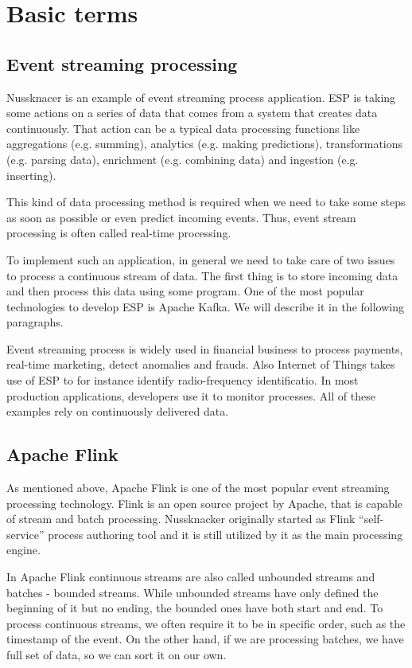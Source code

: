 \chapter{Basic terms}
\label{chap:basic}

\section{Event streaming processing}

Nussknacer is an example of event streaming process application.
ESP is taking some actions on a series of data that comes from a system that creates data continuously.
That action can be a typical data processing functions like aggregations (e.g. summing),
analytics (e.g. making predictions), transformations (e.g. parsing data), enrichment (e.g. combining data)
and ingestion (e.g. inserting).

This kind of data processing method is required when we need to take some steps as soon as possible or even predict incoming events.
Thus, event stream processing is often called real-time processing.

To implement such an application, in general we need to take care of two issues to process a continuous stream of data.
The first thing is to store incoming data and then process this data using some program.
One of the most popular technologies to develop ESP is Apache Kafka. We will describe it in the following paragraphs.

Event streaming process is widely used in financial business to process payments, real-time marketing, detect anomalies and frauds.
Also Internet of Things takes use of ESP to for instance identify radio-frequency identificatio. In most production applications,
developers use it to monitor processes.
All of these examples rely on continuously delivered data.\cite{esp}

\section{Apache Flink}

As mentioned above, Apache Flink is one of the most popular event streaming processing technology.
Flink is an open source project by Apache, that is capable of stream and batch processing. Nussknacker originally started
as Flink “self-service” process authoring tool and it is still utilized by it as the main processing engine.

In Apache Flink continuous streams are also called unbounded streams and batches - bounded streams.
While unbounded streams have only defined the beginning of it but no ending, the bounded ones have both start and end.
To process continuous streams, we often require it to be in specific order, such as the timestamp of the event.
On the other hand, if we are processing batches, we have full set of data, so we can sort it on our own.

